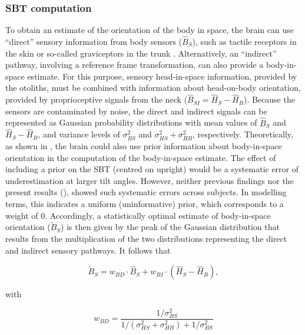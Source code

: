 \subsubsection{SBT computation}
\label{p1:sec:sbt_computation}

To obtain an estimate of the orientation of the body in space, the brain can use ``direct'' sensory information from body sensors ($\hat{B}_S$), such as tactile receptors in the skin or so-called graviceptors in the trunk \cite{mittelstaedt1997, mittelstaedt1998, vaitl2002}. Alternatively, an ``indirect'' pathway, involving a reference frame transformation, can also provide a body-in-space estimate. For this purpose, sensory head-in-space information, provided by the otoliths, must be combined with information about head-on-body orientation, provided by proprioceptive signals from the neck ($\hat{B}_{SI} = \hat{H}_S - \hat{H}_B$). Because the sensors are contaminated by noise, the direct and indirect signals can be represented as Gaussian probability distributions with mean values of $\hat{B}_S$ and $\hat{H}_S - \hat{H}_B$, and variance levels of $\sigma_{BS}^2$ and $\sigma_{HS}^2 + \sigma_{HB}^2$, respectively. Theoretically, as shown in , the brain could also use prior information about body-in-space orientation in the computation of the body-in-space estimate. The effect of including a prior on the SBT (centred on upright) would be a systematic error of underestimation at larger tilt angles. However, neither previous findings \cite{mittelstaedt1983, mast1996, jarchow1999, vanbeuzekom2001} nor the present results (), showed such systematic errors across subjects. In modelling terms, this indicates a uniform (uninformative) prior, which corresponds to a weight of 0. Accordingly, a statistically optimal estimate of body-in-space orientation ($\tilde{B}_S$) is then given by the peak of the Gaussian distribution that results from the multiplication of the two distributions representing the direct and indirect sensory pathways. It follows that

\begin{equation}
\label{p1:eqn2}
\tilde{B}_S = w_{BD} \cdot \hat{B}_S + w_{BI} \cdot (\hat{H}_S - \hat{H}_B),
\end{equation}

with

\begin{equation}
\label{p1:eqn3}
w_{BD} = \frac{1/\sigma^2_{BS}}{1/(\sigma^2_{HS} + \sigma^2_{HB}) + 1/\sigma^2_{BS}}
\end{equation}


